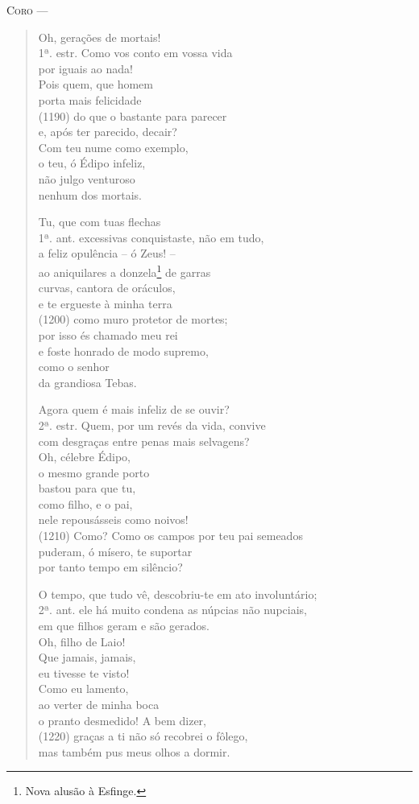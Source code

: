 \textsc{Coro} --- \begin{verse}Oh, gerações de mortais!\\ 1ª. estr.
Como vos conto em vossa vida\\
por iguais ao nada!\\
Pois quem, que homem\\
porta mais felicidade\\ (1190)
do que o bastante para parecer\\
e, após ter parecido, decair?\\
Com teu nume como exemplo,\\
o teu, ó Édipo infeliz,\\
não julgo venturoso\\
nenhum dos mortais.

Tu, que com tuas flechas\\ 1ª. ant.
excessivas conquistaste, não em tudo,\\
a feliz opulência -- ó Zeus! --\\
ao aniquilares a donzela\footnote{Nova alusão à Esfinge.} de garras\\
curvas, cantora de oráculos,\\
e te ergueste à minha terra\\ (1200)
como muro protetor de mortes;\\
por isso és chamado meu rei\\
e foste honrado de modo supremo,\\
como o senhor\\
da grandiosa Tebas.

Agora quem é mais infeliz de se ouvir?\\ 2ª. estr.
Quem, por um revés da vida, convive\\
com desgraças entre penas mais selvagens?\\
Oh, célebre Édipo,\\
o mesmo grande porto\\
bastou para que tu,\\
como filho, e o pai,\\
nele repousásseis como noivos!\\ (1210)
Como? Como os campos por teu pai semeados\\
puderam, ó mísero, te suportar\\
por tanto tempo em silêncio?

O tempo, que tudo vê, descobriu-te em ato involuntário;\\ 2ª. ant.
ele há muito condena as núpcias não nupciais,\\
em que filhos geram e são gerados.\\
Oh, filho de Laio!\\
Que jamais, jamais,\\
eu tivesse te visto!\\
Como eu lamento,\\
ao verter de minha boca\\
o pranto desmedido! A bem dizer,\\ (1220)
graças a ti não só recobrei o fôlego,\\
mas também pus meus olhos a dormir.
\end{verse}


